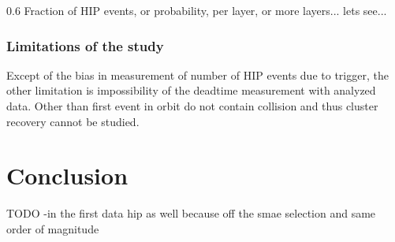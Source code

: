 \begin{table}
\begin{center}
\caption[Table caption text]{Table of ... }
\label{tab:clusterCategories}
\end{center}
\end{table}


                 {0.6}       %
                 {Fraction of HIP events, or probability, per layer, or more layers... lets see... } %

\subsubsection{Limitations of the study}
 
Except of the bias in measurement of number of HIP events due to trigger, the other limitation is impossibility of the deadtime measurement with analyzed data. Other than first event in orbit do not contain collision and thus cluster recovery cannot be studied. 

\section{Conclusion}
TODO
-in the first data hip as well because off the smae selection and same order of magnitude



